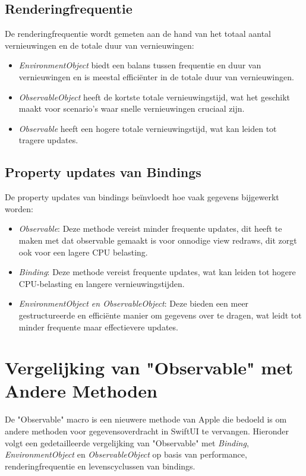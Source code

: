 \subsection{Renderingfrequentie}
De renderingfrequentie wordt gemeten aan de hand van het totaal aantal vernieuwingen en de totale duur van vernieuwingen:
\begin{itemize}
    \item \textit{EnvironmentObject} biedt een balans tussen frequentie en duur van vernieuwingen en is meestal efficiënter in de totale duur van vernieuwingen.
    \item \textit{ObservableObject} heeft de kortste totale vernieuwingstijd, wat het geschikt maakt voor scenario's waar snelle vernieuwingen cruciaal zijn.
    \item \textit{Observable} heeft een hogere totale vernieuwingstijd, wat kan leiden tot tragere updates.
\end{itemize}

\subsection{Property updates van Bindings}
De property updates van bindings beïnvloedt hoe vaak gegevens bijgewerkt worden:
\begin{itemize}
    \item \textit{Observable}: Deze methode vereist minder frequente updates, dit heeft te maken met dat observable gemaakt is voor onnodige view redraws, dit zorgt ook voor een lagere CPU belasting.
    \item \textit{Binding}: Deze methode vereist frequente updates, wat kan leiden tot hogere CPU-belasting en langere vernieuwingstijden.
    \item \textit{EnvironmentObject en ObservableObject}: Deze bieden een meer gestructureerde en efficiënte manier om gegevens over te dragen, wat leidt tot minder frequente maar effectievere updates.
\end{itemize}

\newpage
\section{Vergelijking van "Observable" met Andere Methoden}

De "Observable" macro is een nieuwere methode van Apple die bedoeld is om andere methoden voor gegevensoverdracht in SwiftUI te vervangen. Hieronder volgt een gedetailleerde vergelijking van "Observable" met \textit{Binding}, \textit{EnvironmentObject} en \textit{ObservableObject} op basis van performance, renderingfrequentie en levenscyclussen van bindings.

